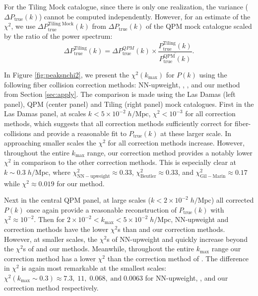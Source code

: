 \documentclass{emulateapj}
\begin{document}
For the Tiling Mock catalogue, since there is only one realization, the variance ($\Delta P_\mathrm{true} (k)$) cannot be computed independently. However, for an estimate of the $\chi^2$, we use $\Delta P_\mathrm{true}^\mathrm{Tiling\;Mock}(k)$ from $\Delta P_\mathrm{true} (k)$ of the QPM mock catalogue scaled by the ratio of the power spectrum:
\begin{equation}
\Delta P_\mathrm{true}^\mathrm{Tiling}(k) = \Delta P_\mathrm{true}^{QPM}(k) \times \frac{P_\mathrm{true}^\mathrm{Tiling}(k)}{\overline{P^\mathrm{QPM}_\mathrm{true}(k)}}.
\end{equation}

In Figure \ref{fig:peaksnchi2}, we present the $\chi^2(k_\mathrm{max})$ for $P(k)$ using the following fiber collision correction methods: NN-upweight, \cite{Beutler:2014aa}, \cite{Gil-Marin:2014aa}, and our method from Section \ref{sec:apply}. The comparison is made using the Las Damas (left panel), QPM (center panel) and Tiling (right panel) mock catalogues. First in the Las Damas panel, at scales $k < 5 \times 10^{-2} \; h/\mathrm{Mpc}$, $\chi^2 < 10^{-3}$ for all correction methods, which suggests that all correction methods sufficiently correct for fiber-collisions and provide a reasonable fit to $P_\mathrm{true}(k)$ at these larger scale. In approaching smaller scales the $\chi^2$ for all correction methods increase. However, throughout the entire $k_\mathrm{max}$ range, our correction method provides a notably lower $\chi^2$ in comparison to the other correction methods. This is especially clear at $k \sim 0.3 \; h/\mathrm{Mpc}$, where $\chi^2_\mathrm{NN-upweight} \approx 0.33$, $\chi^2_\mathrm{Beutler} \approx 0.33$, and $\chi^2_\mathrm{Gil-Marin} \approx 0.17$ while $\chi^2 \approx 0.019$ for our method. 

Next in the central QPM panel, at large scales ($k < 2 \times 10^{-2} \; h/\mathrm{Mpc}$) all corrected $P(k)$ once again provide a reasonable reconstruction of $P_\mathrm{true}(k)$ with $\chi^2 \approx 10^{-2}$. Then for $2 \times 10^{-2} < k_\mathrm{max} < 5 \times 10^{-2}\; h/\mathrm{Mpc}$, NN-upweight and \cite{Beutler:2014aa} correction methods have the lower $\chi^2$s than \cite{Gil-Marin:2014aa} and our correction methods. However, at smaller scales, the $\chi^2$s of NN-upweight and \cite{Beutler:2014aa} quickly increase beyond the $\chi^2$s of \cite{Gil-Marin:2014aa} and our methods. Meanwhile, throughout the entire $k_\mathrm{max}$ range our correction method has a lower $\chi^2$ than the correction method of \cite{Gil-Marin:2014aa}. The difference in $\chi^2$ is again most remarkable at the smallest scales: $\chi^2 (k_\mathrm{max} \sim 0.3) \approx 7.3,\;11, \;0.068, \;\mathrm{and} \; 0.0063$ for NN-upweight, \cite{Beutler:2014aa}, \cite{Gil-Marin:2014aa} and our correction method respectively. 
\end{document}
